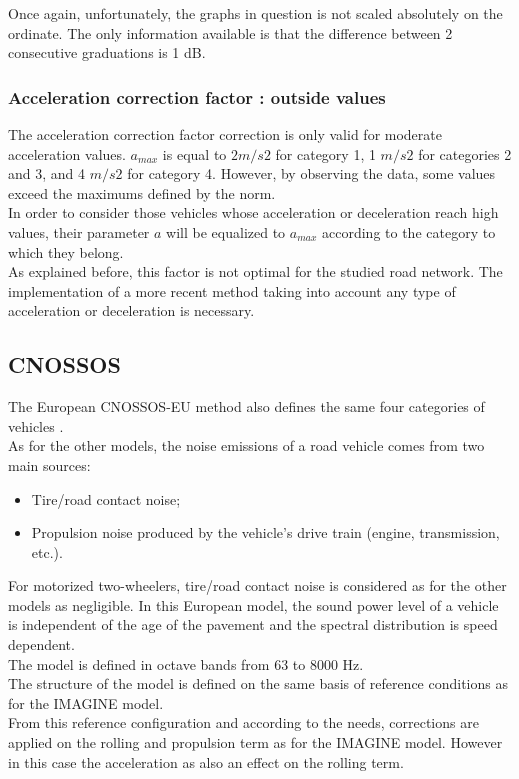 \documentclass{article}
\begin{document}
\noindent Once again, unfortunately, the graphs in question is not scaled absolutely on the ordinate. The only information available is that the difference between 2 consecutive graduations is 1 dB.

\subsubsection{Acceleration correction factor : outside values}

\noindent The acceleration correction factor correction is only valid for moderate acceleration values. $a_{max}$ is equal to $2 m/s2$ for category 1, 1 $m/s2$ for categories 2 and 3, and 4 $m/s2$ for category 4. However, by observing the data, some values exceed the maximums defined by the norm.\\
In order to consider those vehicles whose acceleration or deceleration reach high values, their parameter $a$ will be equalized to $a_{max}$ according to the category to which they belong.\\

\noindent As explained before, this factor is not optimal for the studied road network. The implementation of a more recent method taking into account any type of acceleration or deceleration is necessary.




\subsection{CNOSSOS}
{\color{red}
\noindent The European CNOSSOS-EU method also defines the same four categories of vehicles \cite{Kephalopoulos2012}.} \\

\noindent As for the other models, the noise emissions of a road vehicle comes from two main sources: 

\begin{itemize}
    \item Tire/road contact noise;
    \item Propulsion noise produced by the vehicle's drive train (engine, transmission, etc.).
\end{itemize}

\noindent For motorized two-wheelers, tire/road contact noise is considered as for the other models as negligible. In this European model, the sound power level of a vehicle is independent of the age of the pavement and the spectral distribution is speed dependent. \\
The model is defined in octave bands from 63 to 8000 Hz. \\
The structure of the model is defined on the same basis of reference conditions as for the IMAGINE model. \\
\noindent From this reference configuration and according to the needs, corrections are applied on the rolling and propulsion term as for the IMAGINE model.
However in this case the acceleration as also an effect on the rolling term.
\end{document}
